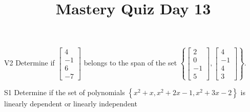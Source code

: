 \documentclass{sbgLAquiz}
\title{Mastery Quiz Day 13 }
\begin{document}
\begin{problem}{V2}
  Determine if
  \(\begin{bmatrix} 4 \\ -1 \\ 6 \\ -7 \end{bmatrix}\)
  belongs to the span of the set
  \(\left\{
    \begin{bmatrix} 2 \\ 0 \\ -1 \\ 5 \end{bmatrix},
    \begin{bmatrix} 4 \\ -1 \\ 4 \\ 3 \end{bmatrix}
    \right\}
  \).
\end{problem}

\begin{problem}{S1}
Determine if the set of polynomials  $\left\{x^2+x, x^2+2x-1, x^2+3x-2\right\}$ is  linearly dependent or linearly independent
\end{problem}
\end{document}
